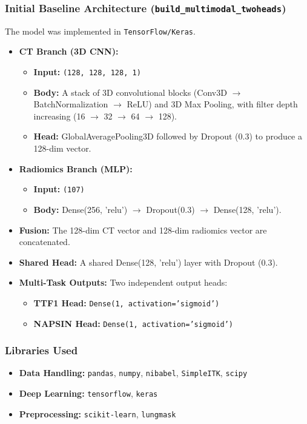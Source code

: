 \subsubsection{Initial Baseline Architecture (\texttt{build\_multimodal\_twoheads})}
The model was implemented in \texttt{TensorFlow/Keras}.
\begin{itemize}
    \item \textbf{CT Branch (3D CNN):}
    \begin{itemize}
        \item \textbf{Input:} \texttt{(128, 128, 128, 1)}
        \item \textbf{Body:} A stack of 3D convolutional blocks (Conv3D $\rightarrow$ BatchNormalization $\rightarrow$ ReLU) and 3D Max Pooling, with filter depth increasing (16 $\rightarrow$ 32 $\rightarrow$ 64 $\rightarrow$ 128).
        \item \textbf{Head:} GlobalAveragePooling3D followed by Dropout (0.3) to produce a 128-dim vector.
    \end{itemize}
    \item \textbf{Radiomics Branch (MLP):}
    \begin{itemize}
        \item \textbf{Input:} \texttt{(107)}
        \item \textbf{Body:} Dense(256, 'relu') $\rightarrow$ Dropout(0.3) $\rightarrow$ Dense(128, 'relu').
    \end{itemize}
    \item \textbf{Fusion:} The 128-dim CT vector and 128-dim radiomics vector are concatenated.
    \item \textbf{Shared Head:} A shared Dense(128, 'relu') layer with Dropout (0.3).
    \item \textbf{Multi-Task Outputs:} Two independent output heads:
    \begin{itemize}
        \item \textbf{TTF1 Head:} \texttt{Dense(1, activation='sigmoid')}
        \item \textbf{NAPSIN Head:} \texttt{Dense(1, activation='sigmoid')}
    \end{itemize}
\end{itemize}



\subsubsection{Libraries Used}
\begin{itemize}
    \item \textbf{Data Handling:} \texttt{pandas}, \texttt{numpy}, \texttt{nibabel}, \texttt{SimpleITK}, \texttt{scipy}
    \item \textbf{Deep Learning:} \texttt{tensorflow}, \texttt{keras}
    \item \textbf{Preprocessing:} \texttt{scikit-learn}, \texttt{lungmask}
\end{itemize}

